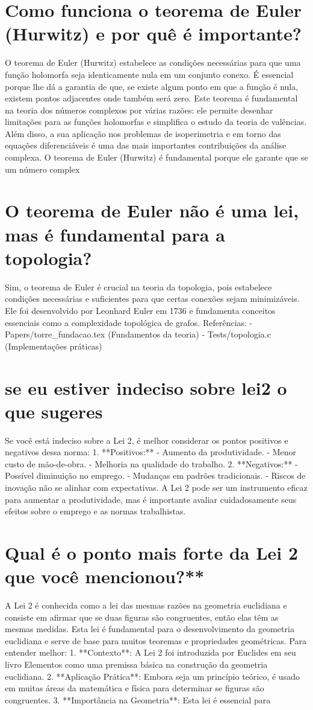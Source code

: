 \documentclass[11pt,a4paper]{article}
\begin{document}
\section{Como funciona o teorema de Euler (Hurwitz) e por quê é importante?}
O teorema de Euler (Hurwitz) estabelece as condições necessárias para que uma função holomorfa seja identicamente nula em um conjunto conexo. É essencial porque lhe dá a garantia de que, se existe algum ponto em que a função é nula, existem pontos adjacentes onde também será zero. Este teorema é fundamental na teoria dos números complexos por várias razões: ele permite desenhar limitações para as funções holomorfas e simplifica o estudo da teoria de valências. Além disso, a sua aplicação nos problemas de isoperimetria e em torno das equações diferenciáveis é uma das mais importantes contribuições da análise complexa. O teorema de Euler (Hurwitz) é fundamental porque ele garante que se um número complex

\section{O teorema de Euler não é uma lei, mas é fundamental para a topologia?}
Sim, o teorema de Euler é crucial na teoria da topologia, pois estabelece condições necessárias e suficientes para que certas conexões sejam minimizáveis. Ele foi desenvolvido por Leonhard Euler em 1736 e fundamenta conceitos essenciais como a complexidade topológica de grafos. Referências: - Papers/torre\_fundacao.tex (Fundamentos da teoria) - Tests/topologia.c (Implementações práticas)

\section{se eu estiver indeciso sobre lei2 o que sugeres}
Se você está indeciso sobre a Lei 2, é melhor considerar os pontos positivos e negativos dessa norma: 1. **Positivos:** - Aumento da produtividade. - Menor custo de mão-de-obra. - Melhoria na qualidade do trabalho. 2. **Negativos:** - Possível diminuição no emprego. - Mudanças em padrões tradicionais. - Riscos de inovação não se alinhar com expectativas. A Lei 2 pode ser um instrumento eficaz para aumentar a produtividade, mas é importante avaliar cuidadosamente seus efeitos sobre o emprego e as normas trabalhistas.

\section{Qual é o ponto mais forte da Lei 2 que você mencionou?**}
A Lei 2 é conhecida como a lei das mesmas razões na geometria euclidiana e consiste em afirmar que se duas figuras são congruentes, então elas têm as mesmas medidas. Esta lei é fundamental para o desenvolvimento da geometria euclidiana e serve de base para muitos teoremas e propriedades geométricas. Para entender melhor: 1. **Contexto**: A Lei 2 foi introduzida por Euclides em seu livro Elementos como uma premissa básica na construção da geometria euclidiana. 2. **Aplicação Prática**: Embora seja um princípio teórico, é usado em muitas áreas da matemática e física para determinar se figuras são congruentes. 3. **Importância na Geometria**: Esta lei é essencial para
\end{document}
